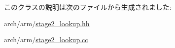 このクラスの説明は次のファイルから生成されました:\begin{DoxyCompactItemize}
\item 
arch/arm/\hyperlink{stage2__lookup_8hh}{stage2\_\-lookup.hh}\item 
arch/arm/\hyperlink{stage2__lookup_8cc}{stage2\_\-lookup.cc}\end{DoxyCompactItemize}
